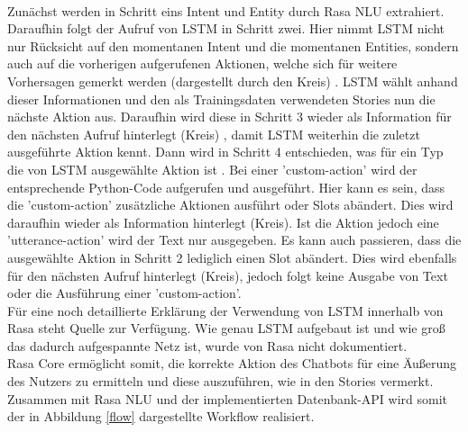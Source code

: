\\Zunächst werden in Schritt eins Intent und Entity durch Rasa NLU extrahiert. Daraufhin folgt der Aufruf von LSTM in Schritt zwei. Hier nimmt LSTM nicht nur Rücksicht auf den momentanen Intent und die momentanen Entities, sondern auch auf die vorherigen aufgerufenen Aktionen, welche sich für weitere Vorhersagen gemerkt werden (dargestellt durch den Kreis) \cite{lstmrasa}. LSTM wählt anhand dieser Informationen und den als Trainingsdaten verwendeten Stories nun die nächste Aktion aus. Daraufhin wird diese in Schritt 3 wieder als Information für den nächsten Aufruf hinterlegt (Kreis) \cite{lstmrasa}, damit LSTM weiterhin die zuletzt ausgeführte Aktion kennt. Dann wird in Schritt 4 entschieden, was für ein Typ die von LSTM ausgewählte Aktion ist \cite{lstmrasa}. Bei einer 'custom-action' wird der entsprechende Python-Code aufgerufen und ausgeführt. Hier kann es sein, dass die 'custom-action' zusätzliche Aktionen ausführt oder Slots abändert. Dies wird daraufhin wieder als Information hinterlegt (Kreis). Ist die Aktion jedoch eine 'utterance-action' wird der Text nur ausgegeben. Es kann auch passieren, dass die ausgewählte Aktion in Schritt 2 lediglich einen Slot abändert. Dies wird ebenfalls für den nächsten Aufruf hinterlegt (Kreis), jedoch folgt keine Ausgabe von Text oder die Ausführung einer 'custom-action'.\\
Für eine noch detaillierte Erklärung der Verwendung von LSTM innerhalb von Rasa steht Quelle \cite{lstmrasa} zur Verfügung. Wie genau LSTM aufgebaut ist und wie groß das dadurch aufgespannte Netz ist, wurde von Rasa nicht dokumentiert.\\
Rasa Core ermöglicht somit, die korrekte Aktion des Chatbots für eine Äußerung des Nutzers zu ermitteln und diese auszuführen, wie in den Stories vermerkt. Zusammen mit Rasa NLU und der implementierten Datenbank-API wird somit der in Abbildung \ref{flow} dargestellte Workflow realisiert.

